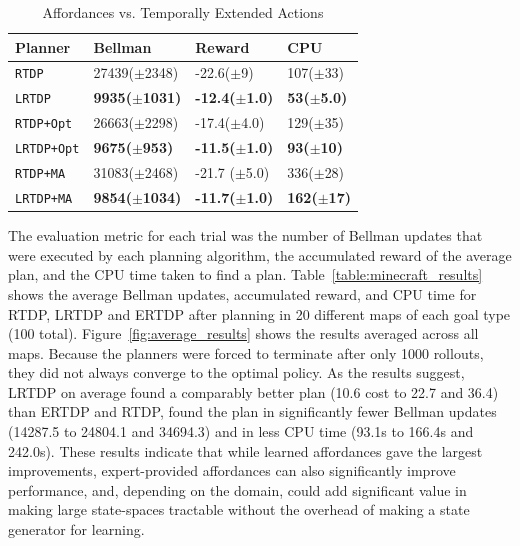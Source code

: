 \documentclass[letterpaper]{article}
\newcommand{\ra}[1]{\renewcommand{\arraystretch}{#1}} %
\begin{document}
\begin{table}[b]
\ra{1.3}
\begin{tabular}{@{}llll@{}}\toprule
Planner & Bellman & Reward & CPU \\ \midrule
\texttt{RTDP}   			&	27439($\pm$2348)	&	-22.6($\pm$9)& 107($\pm$33) \\
\texttt{LRTDP} 			& 	{\bf 9935($\pm$1031)}	&	{\bf -12.4($\pm$1.0)}& \bf{53}($\pm$5.0) \\ \hline
\texttt{RTDP+Opt}  		&	26663($\pm$2298)	&	-17.4($\pm$4.0) & 129($\pm$35) \\
\texttt{LRTDP+Opt} 		& 	\bf{9675}($\pm$953)	&	\bf{-11.5}($\pm$1.0)&{\bf 93($\pm$10)} \\ \hline
\texttt{RTDP+MA}  		&	31083($\pm$2468)	&	-21.7	($\pm$5.0)&336($\pm$28) \\
\texttt{LRTDP+MA}  		& 	{\bf 9854($\pm$1034)}	&	{\bf -11.7($\pm$1.0)}&{\bf 162($\pm$17)} \\ %
\bottomrule
\end{tabular}

\caption{Affordances vs. Temporally Extended Actions\label{table:temp_ext_act_results}}
\end{table}

The evaluation metric for each trial was the number of Bellman updates
that were executed by each planning algorithm, the accumulated reward
of the average plan, and the CPU time taken to find a
plan. Table~\ref{table:minecraft_results} shows the average Bellman
updates, accumulated reward, and CPU time for RTDP, LRTDP and ERTDP
after planning in 20 different maps of each goal type (100
total). Figure~\ref{fig:average_results} shows the results averaged
across all maps. Because the planners were forced to terminate after
only 1000 rollouts, they did not always converge to the optimal
policy. As the results suggest, LRTDP on average found a comparably
better plan (10.6 cost to 22.7 and 36.4) than ERTDP and RTDP, found
the plan in significantly fewer Bellman updates (14287.5 to 24804.1
and 34694.3) and in less CPU time (93.1s to 166.4s and 242.0s).  These
results indicate that while learned affordances gave the largest
improvements, expert-provided affordances can also significantly
improve performance, and, depending on the domain, could add
significant value in making large state-spaces tractable without the
overhead of making a state generator for learning.
\end{document}
